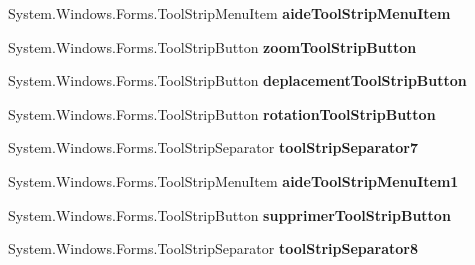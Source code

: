 \begin{DoxyCompactItemize}
\item 
System.\+Windows.\+Forms.\+Tool\+Strip\+Menu\+Item {\bfseries aide\+Tool\+Strip\+Menu\+Item}\hypertarget{class_interface_graphique_1_1_edition_a4541bbee90b1b9a4d2475da9694c414b}{}\label{class_interface_graphique_1_1_edition_a4541bbee90b1b9a4d2475da9694c414b}

\item 
System.\+Windows.\+Forms.\+Tool\+Strip\+Button {\bfseries zoom\+Tool\+Strip\+Button}\hypertarget{class_interface_graphique_1_1_edition_a41e7b49ad7a98ca18c647b397c2a7eb7}{}\label{class_interface_graphique_1_1_edition_a41e7b49ad7a98ca18c647b397c2a7eb7}

\item 
System.\+Windows.\+Forms.\+Tool\+Strip\+Button {\bfseries deplacement\+Tool\+Strip\+Button}\hypertarget{class_interface_graphique_1_1_edition_a48300b5b448a2fb30c53bdaf922ba2a7}{}\label{class_interface_graphique_1_1_edition_a48300b5b448a2fb30c53bdaf922ba2a7}

\item 
System.\+Windows.\+Forms.\+Tool\+Strip\+Button {\bfseries rotation\+Tool\+Strip\+Button}\hypertarget{class_interface_graphique_1_1_edition_a38b20378828472a39663daf9afebcce4}{}\label{class_interface_graphique_1_1_edition_a38b20378828472a39663daf9afebcce4}

\item 
System.\+Windows.\+Forms.\+Tool\+Strip\+Separator {\bfseries tool\+Strip\+Separator7}\hypertarget{class_interface_graphique_1_1_edition_a4d745d05a17bcbbf70c875429471a982}{}\label{class_interface_graphique_1_1_edition_a4d745d05a17bcbbf70c875429471a982}

\item 
System.\+Windows.\+Forms.\+Tool\+Strip\+Menu\+Item {\bfseries aide\+Tool\+Strip\+Menu\+Item1}\hypertarget{class_interface_graphique_1_1_edition_a20ce2ef75e0681c527cb4c8a4d526911}{}\label{class_interface_graphique_1_1_edition_a20ce2ef75e0681c527cb4c8a4d526911}

\item 
System.\+Windows.\+Forms.\+Tool\+Strip\+Button {\bfseries supprimer\+Tool\+Strip\+Button}\hypertarget{class_interface_graphique_1_1_edition_a886016e7efdcc99585b0dbd5120e5b00}{}\label{class_interface_graphique_1_1_edition_a886016e7efdcc99585b0dbd5120e5b00}

\item 
System.\+Windows.\+Forms.\+Tool\+Strip\+Separator {\bfseries tool\+Strip\+Separator8}\hypertarget{class_interface_graphique_1_1_edition_aee3fe216e2d5bd2e3fc0ef20b597328c}{}\label{class_interface_graphique_1_1_edition_aee3fe216e2d5bd2e3fc0ef20b597328c}


\end{DoxyCompactItemize}
